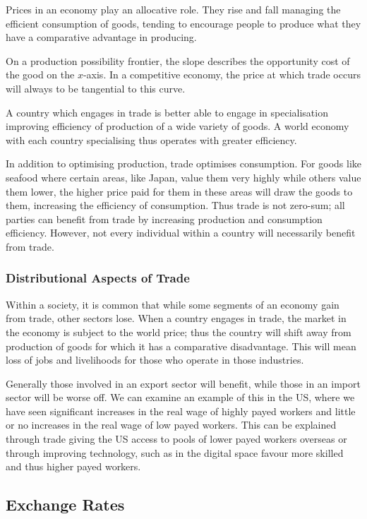\documentclass[12pt]{report}
\begin{document}
\begin{flushleft}
Prices in an economy play an allocative role. They rise and fall managing the
efficient consumption of goods, tending to encourage people to produce what
they have a comparative advantage in producing. \par
On a production possibility frontier, the slope describes the opportunity cost
of the good on the \(x\)-axis. In a competitive economy, the price at which
trade occurs will always to be tangential to this curve. \par
A country which engages in trade is better able to engage in specialisation
improving efficiency of production of a wide variety of goods. A world economy
with each country specialising thus operates with greater efficiency. \par
In addition to optimising production, trade optimises consumption. For goods
like seafood where certain areas, like Japan, value them very highly while
others value them lower, the higher price paid for them in these areas will
draw the goods to them, increasing the efficiency of consumption. Thus trade is
not zero-sum; all parties can benefit from trade by increasing production and
consumption efficiency. However, not every individual within a country will
necessarily benefit from trade.

\subsubsection*{Distributional Aspects of Trade}

Within a society, it is common that while some segments of an economy gain from
trade, other sectors lose. When a country engages in trade, the market in the
economy is subject to the world price; thus the country will shift away from
production of goods for which it has a comparative disadvantage. This will mean
loss of jobs and livelihoods for those who operate in those industries. \par
Generally those involved in an export sector will benefit, while those in an
import sector will be worse off. We can examine an example of this in the US,
where we have seen significant increases in the real wage of highly payed
workers and little or no increases in the real wage of low payed workers. This
can be explained through trade giving the US access to pools of lower payed
workers overseas or through improving technology, such as in the digital space
favour more skilled and thus higher payed workers.

\subsection*{Exchange Rates}


\end{flushleft}
\end{document}
